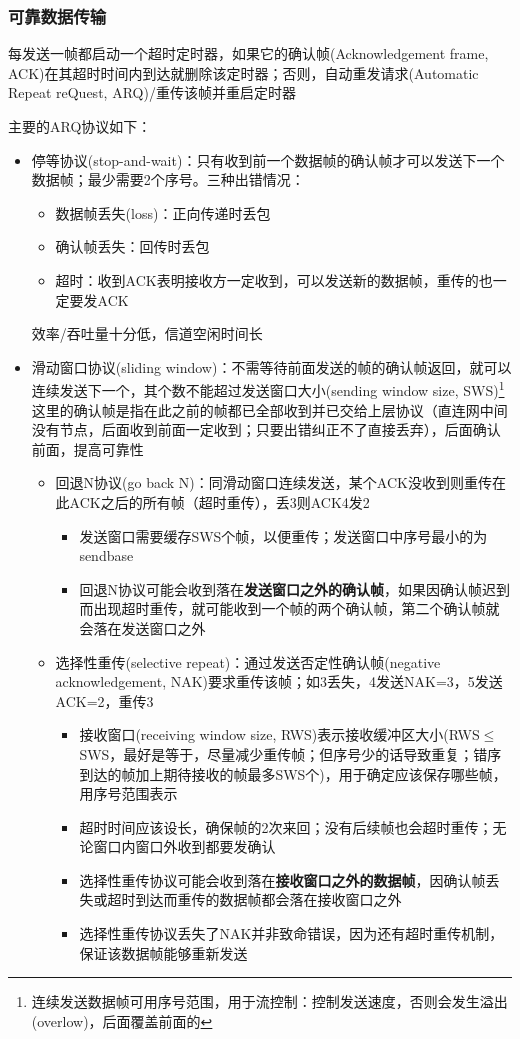 \subsubsection{可靠数据传输}
每发送一帧都启动一个超时定时器，如果它的确认帧(Acknowledgement frame, ACK)在其超时时间内到达就删除该定时器；否则，自动重发请求(Automatic Repeat reQuest, ARQ)/重传该帧并重启定时器

主要的ARQ协议如下：
\begin{itemize}
	\item 停等协议(stop-and-wait)：只有收到前一个数据帧的确认帧才可以发送下一个数据帧；最少需要2个序号。三种出错情况：
	\begin{itemize}
		\item 数据帧丢失(loss)：正向传递时丢包
		\item 确认帧丢失：回传时丢包
		\item 超时：收到ACK表明接收方一定收到，可以发送新的数据帧，重传的也一定要发ACK
	\end{itemize}
	效率/吞吐量十分低，信道空闲时间长
	\item 滑动窗口协议(sliding window)：不需等待前面发送的帧的确认帧返回，就可以连续发送下一个，其个数不能超过发送窗口大小(sending window size, SWS)\footnote{连续发送数据帧可用序号范围，用于流控制：控制发送速度，否则会发生溢出(overlow)，后面覆盖前面的}\\
	这里的确认帧是指在此之前的帧都已全部收到并已交给上层协议（直连网中间没有节点，后面收到前面一定收到；只要出错纠正不了直接丢弃），后面确认前面，提高可靠性
	\begin{itemize}
	\item 回退N协议(go back N)：同滑动窗口连续发送，某个ACK没收到则重传在此ACK之后的所有帧（超时重传），丢3则ACK4发2
	\begin{itemize}
		\item 发送窗口需要缓存SWS个帧，以便重传；发送窗口中序号最小的为sendbase
		\item 回退N协议可能会收到落在\textbf{发送窗口之外的确认帧}，如果因确认帧迟到而出现超时重传，就可能收到一个帧的两个确认帧，第二个确认帧就会落在发送窗口之外
	\end{itemize}
	\item 选择性重传(selective repeat)：通过发送否定性确认帧(negative acknowledgement, NAK)要求重传该帧；如3丢失，4发送NAK=3，5发送ACK=2，重传3
	\begin{itemize}
		\item 接收窗口(receiving window size, RWS)表示接收缓冲区大小(RWS$\leq$SWS，最好是等于，尽量减少重传帧；但序号少的话导致重复；错序到达的帧加上期待接收的帧最多SWS个)，用于确定应该保存哪些帧，用序号范围表示
		\item 超时时间应该设长，确保帧的2次来回；没有后续帧也会超时重传；无论窗口内窗口外收到都要发确认
		\item 选择性重传协议可能会收到落在\textbf{接收窗口之外的数据帧}，因确认帧丢失或超时到达而重传的数据帧都会落在接收窗口之外
		\item 选择性重传协议丢失了NAK并非致命错误，因为还有超时重传机制，保证该数据帧能够重新发送
	\end{itemize}
	\end{itemize}
\end{itemize}
